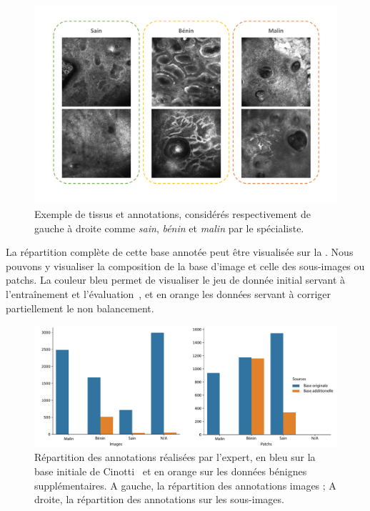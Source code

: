 \begin{figure}[H]
    \begin{center}
        \includegraphics[width=\linewidth]{contents/ii_preamble_microscopy/resources/example_rcm_data.pdf}
        \caption{Exemple de tissus et annotations, considérés respectivement de gauche à droite comme \textit{sain}, \textit{bénin} et \textit{malin} par le spécialiste.}
        \label{fig:example_rcm_data}
    \end{center} 
\end{figure}\par

La répartition complète de cette base annotée peut être visualisée sur la . Nous pouvons y visualiser la composition de la base d'image et celle des sous-images ou patchs. La couleur bleu permet de visualiser le jeu de donnée initial servant à l'entraînement et l'évaluation~\cite{Cinotti2018}, et en orange les données servant à corriger partiellement le non balancement.\par

\begin{figure}[H]
    \begin{center}
        \includegraphics[width=\linewidth]{contents/ii_preamble_microscopy/resources/scheme_rcm_statistics.pdf}
        \caption{Répartition des annotations réalisées par l'expert, en bleu sur la base initiale de Cinotti~\cite{Cinotti2018} et en orange sur les données bénignes supplémentaires. A gauche, la répartition des annotations images ; A droite, la répartition des annotations sur les sous-images.}
        \label{fig:scheme_rcm_statistics}
    \end{center} 
\end{figure}\par

